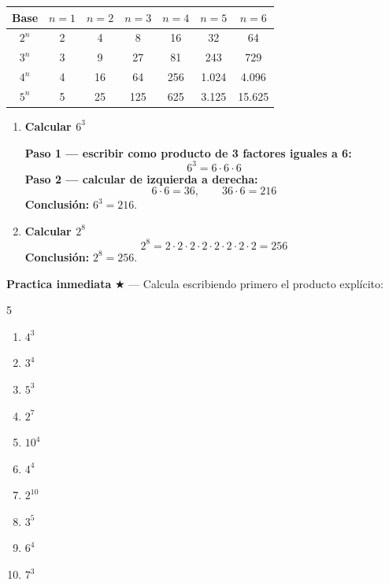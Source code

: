 \documentclass[11pt, letterpaper]{article}
\begin{document}
\begin{tcolorbox}[importantbox, title={Tabla de potencias de referencia — bases 2 a 5}]
\begin{center}
\renewcommand{\arraystretch}{1.3}
\begin{tabular}{c|c|c|c|c|c|c}
\toprule
\textbf{Base} & $n=1$ & $n=2$ & $n=3$ & $n=4$ & $n=5$ & $n=6$\\
\midrule
$2^n$ & 2 & 4 & 8 & 16 & 32 & 64\\
$3^n$ & 3 & 9 & 27 & 81 & 243 & 729\\
$4^n$ & 4 & 16 & 64 & 256 & 1.024 & 4.096\\
$5^n$ & 5 & 25 & 125 & 625 & 3.125 & 15.625\\
\bottomrule
\end{tabular}
\end{center}
\end{tcolorbox}

\begin{tcolorbox}[examplebox, title={Ejemplos — valor de la potencia}]
\begin{enumerate}[label=\textbf{Ej. \arabic*.}, leftmargin=*, itemsep=14pt]

\item \textbf{Calcular $6^3$}

\textbf{Paso 1 — escribir como producto de 3 factores iguales a 6:}
$$6^3 = 6 \cdot 6 \cdot 6$$
\textbf{Paso 2 — calcular de izquierda a derecha:}
$$6 \cdot 6 = 36, \qquad 36 \cdot 6 = 216$$
\textbf{Conclusión:} $6^3 = 216$.

\item \textbf{Calcular $2^8$}
$$2^8 = 2\cdot 2\cdot 2\cdot 2\cdot 2\cdot 2\cdot 2\cdot 2 = 256$$
\textbf{Conclusión:} $2^8 = 256$.

\end{enumerate}
\end{tcolorbox}

\medskip
\textbf{Practica inmediata} \quad $\bigstar$ — Calcula escribiendo primero el producto explícito:
\begin{multicols}{5}
\begin{enumerate}[label=\alph*), leftmargin=*]
  \item $4^3$
  \item $3^4$
  \item $5^3$
  \item $2^7$
  \item $10^4$
  \item $4^4$
  \item $2^{10}$
  \item $3^5$
  \item $6^4$
  \item $7^3$
\end{enumerate}
\end{multicols}
\end{document}
